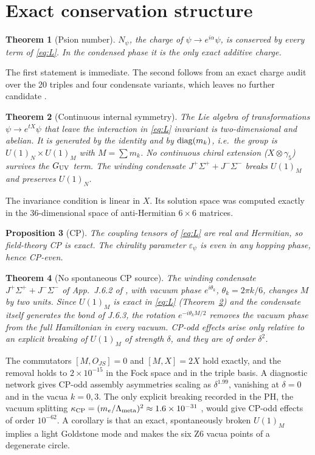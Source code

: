 \documentclass[11pt]{article}
\newtheorem{theorem}{Theorem}
\newtheorem{proposition}[theorem]{Proposition}
\newcommand{\Lm}{\Lambda_{\rm meta}}
\newcommand{\Np}{N_\psi}
\begin{document}
\section{Exact conservation structure}\label{sec:exact}

\begin{theorem}[Psion number]\label{th:N}
$\Np$, the charge of $\psi\to e^{i\alpha}\psi$, is conserved by every term of \eqref{eq:L}. In the condensed phase it is the only exact additive charge.
\end{theorem}
\noindent The first statement is immediate. The second follows from an exact charge audit over the 20 triples and four condensate variants, which leaves no further candidate \cite{repo}.

\begin{theorem}[Continuous internal symmetry]\label{th:sym}
The Lie algebra of transformations $\psi\to e^{tX}\psi$ that leave the interaction in \eqref{eq:L} invariant is two-dimensional and abelian. It is generated by the identity and by ${\rm diag}(m_k)$, i.e.\ the group is $U(1)_N\times U(1)_M$ with $M=\sum m_k$. No continuous chiral extension ($X\otimes\gamma_5$) survives the $G_{\rm UV}$ term. The winding condensate $J^+\Sigma^++J^-\Sigma^-$ breaks $U(1)_M$ and preserves $U(1)_N$.
\end{theorem}
\noindent The invariance condition is linear in $X$. Its solution space was computed exactly in the 36-dimensional space of anti-Hermitian $6\times6$ matrices.

\begin{proposition}[CP]\label{pr:cp}
The coupling tensors of \eqref{eq:L} are real and Hermitian, so field-theory CP is exact. The chirality parameter $\varepsilon_\psi$ is even in any hopping phase, hence CP-even. \end{proposition}

\begin{theorem}[No spontaneous CP source]\label{th:nocp}
The winding condensate $J^+\Sigma^++J^-\Sigma^-$ of App.~J.6.2 of \cite{phf}, with vacuum phase $e^{i\theta_k}$, $\theta_k=2\pi k/6$, changes $M$ by two units. Since $U(1)_M$ is exact in \eqref{eq:L} (Theorem~\ref{th:sym}) and the condensate itself generates the bond of J.6.3, the rotation $e^{-i\theta_kM/2}$ removes the vacuum phase from the full Hamiltonian in every vacuum. CP-odd effects arise only relative to an explicit breaking of $U(1)_M$ of strength $\delta$, and they are of order $\delta^2$.
\end{theorem}
\noindent The commutators $[M,O_{JS}]=0$ and $[M,X]=2X$ hold exactly, and the removal holds to $2\times10^{-15}$ in the Fock space and in the triple basis. A diagnostic network gives CP-odd assembly asymmetries scaling as $\delta^{1.99}$, vanishing at $\delta=0$ and in the vacua $k=0,3$. The only explicit breaking recorded in the PH, the vacuum splitting $\kappa_{\rm CP}=(m_e/\Lm)^2\approx1.6\times10^{-31}$ \cite{phf}, would give CP-odd effects of order $10^{-62}$. A corollary is that an exact, spontaneously broken $U(1)_M$ implies a light Goldstone mode and makes the six Z6 vacua points of a degenerate circle.
\end{document}
